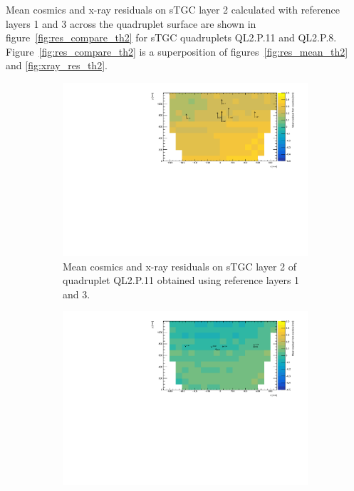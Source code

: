 Mean cosmics and x-ray residuals on sTGC layer 2 calculated with reference layers 1 and 3 across the quadruplet surface are shown in figure~\ref{fig:res_compare_th2} for sTGC quadruplets QL2.P.11 and QL2.P.8. Figure~\ref{fig:res_compare_th2} is a superposition of figures~\ref{fig:res_mean_th2} and \ref{fig:xray_res_th2}.

\newpage
\thispagestyle{empty}
\begin{figure}
\centering
\begin{subfigure}{\textwidth}
  \centering
  \includegraphics[width=\linewidth]{figures/QL2P11_compare_residuals_th2_layer2_fixedlayers13.pdf}
  \caption{Mean cosmics and x-ray residuals on sTGC layer 2 of quadruplet QL2.P.11 obtained using reference layers 1 and 3.}
  \label{fig:res_compare_th2_ql2p11}
\end{subfigure}%
\vspace*{\floatsep}
\begin{subfigure}{\textwidth}
  \centering
  \includegraphics[width=\linewidth]{figures/QL2P08_compare_residuals_th2_layer2_fixedlayers13.pdf}

\end{subfigure}
\end{figure}
